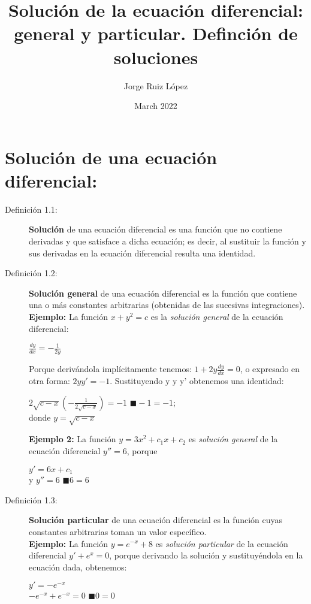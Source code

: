 \documentclass{article}
\title{ Solución de la ecuación diferencial: general y particular. Definción de soluciones}
\author{Jorge Ruiz López}
\affil{Facultad de Ingeniería UNAM}
\date{March 2022}
\begin{document}
\maketitle
\section{Solución de una ecuación diferencial:}
\begin{description}
\item[Definición 1.1:]\textbf{Solución}\cite{carmona} de una ecuación diferencial es una función que no contiene derivadas y que satisface a dicha ecuación; es decir, al sustituir la función y sus derivadas en la ecuación diferencial resulta una identidad.
\item[Definición 1.2:]\textbf{Solución general} de una ecuación diferencial es la función
que contiene una o más constantes arbitrarias (obtenidas de las sucesivas integraciones).\\
\textbf{Ejemplo:}
La función $x+y^2 = c$ es la \emph{solución general} de la ecuación diferencial:
\begin{center} $\frac{dy}{dx} = -\frac{1}{2y}$ \end{center}
Porque derivándola implícitamente tenemos: $1+2y\frac{dy}{dx} = 0$, o expresado en otra forma: $2yy' = -1$.
Sustituyendo y y y' obtenemos una identidad: 
\begin{center}${2\sqrt{c-x}} {(-\frac{1}{2\sqrt{c-x}})} = -1$ $\blacksquare  -1 = -1$;\\
donde $y=\sqrt{c-x}$\end{center}
\textbf{Ejemplo 2:} La función $y=3x^2+c_1x+c_2$ es \emph{solución general} de la ecuación diferencial $y''= 6$, porque \begin{center}$y'=6x +c_1$\\ y $y'' = 6$ $\blacksquare 6=6$\end{center}
\item[Definición 1.3:]\textbf{Solución particular} de una ecuación diferencial es la función cuyas constantes arbitrarias toman un valor específico.\\
\textbf{Ejemplo:} La función $y = e^{-x}+8$ es \emph{solución particular} de la ecuación diferencial 
$y'+e^x=0$, porque derivando la solución y sustituyéndola en la ecuación dada, obtenemos:
\begin{center}
$y'=-e^{-x}$\\$-e^{-x}+e^{-x}=0$ $\blacksquare 0 = 0$
\end{center}
\end{description}

\printbibliography
\end{document}
